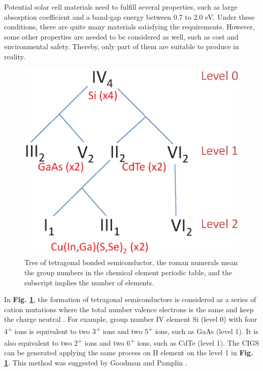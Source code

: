 \documentclass[a4paper, 12pt, titlepage,oneside,drop]{kthesis}
\begin{document}
Potential solar cell materials need to fulfill several properties, such as large absorption coefficient and a band-gap energy between 0.7 to 2.0 eV. Under these conditions, there are quite many materials satisfying the 
requirements. However, some other properties are needed to be considered as well, such as cost and environmental safety. Thereby, only part of them are suitable to produce in reality.

\begin{figure}[H]
\centering
\includegraphics[scale=0.5]{tree.eps} 
\caption{Tree of tetragonal bonded semiconductor, the roman numerals mean the group numbers in the chemical element periodic table, and the subscript implies the number of elements.}
\label{lscm}
\end{figure}

In \textbf{Fig. \ref{lscm}}, the formation of tetragonal semiconductors is considered as a series of cation mutations where the total number valence electrons is the same and keep the charge neutral \cite{chen2009electronic, chen2009crystal, walsh2009design}. For example, group number
IV element Si (level 0) with four 4\textsuperscript{+} ions is equivalent to two 3\textsuperscript{+} ions and two 5\textsuperscript{+} ions, such as GaAs (level 1). It is also equivalent to two 2\textsuperscript{+} ions
and two 6\textsuperscript{+} ions, such as CdTe (level 1). The CIGS can be generated applying the same process on II element on the level 1 in \textbf{Fig. \ref{lscm}}. This method was suggested by Goodman and Pamplin 
\cite{goodman1958prediction, pamplin1964systematic}. 
\end{document}
